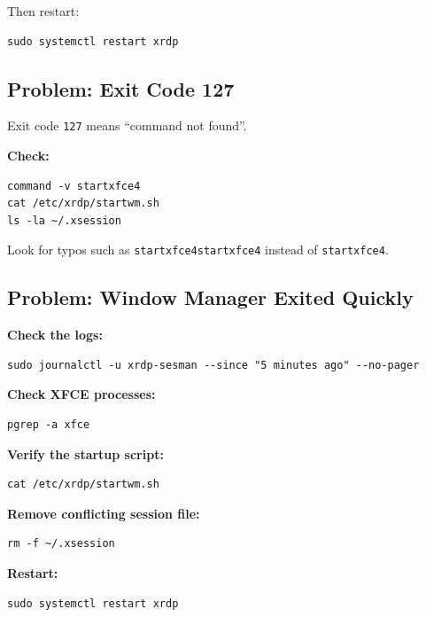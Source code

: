 \documentclass[a4paper,12pt]{article}
\newcommand{\code}[1]{\texttt{\small #1}}
\begin{document}
Then restart:

\begin{lstlisting}[style=bashstyle]
sudo systemctl restart xrdp
\end{lstlisting}

\subsection{Problem: Exit Code 127}

Exit code \code{127} means ``command not found''.

\textbf{Check:}

\begin{lstlisting}[style=bashstyle]
command -v startxfce4
cat /etc/xrdp/startwm.sh
ls -la ~/.xsession
\end{lstlisting}

Look for typos such as \code{startxfce4startxfce4} instead of \code{startxfce4}.

\subsection{Problem: Window Manager Exited Quickly}

\textbf{Check the logs:}

\begin{lstlisting}[style=bashstyle]
sudo journalctl -u xrdp-sesman --since "5 minutes ago" --no-pager
\end{lstlisting}

\textbf{Check XFCE processes:}

\begin{lstlisting}[style=bashstyle]
pgrep -a xfce
\end{lstlisting}

\textbf{Verify the startup script:}

\begin{lstlisting}[style=bashstyle]
cat /etc/xrdp/startwm.sh
\end{lstlisting}

\textbf{Remove conflicting session file:}

\begin{lstlisting}[style=bashstyle]
rm -f ~/.xsession
\end{lstlisting}

\textbf{Restart:}

\begin{lstlisting}[style=bashstyle]
sudo systemctl restart xrdp
\end{lstlisting}
\end{document}
